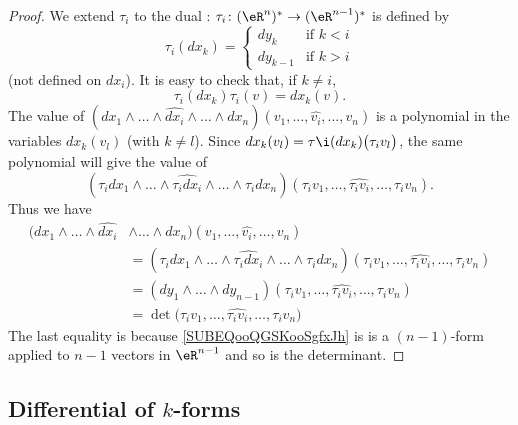 \begin{proof}
    We extend \( \tau_i\) to the dual : \( \tau_i\colon(\eR^n)^*  \to (\eR^{n-1})^*\) is defined by
    \begin{equation}
        \tau_i(dx_k)=\begin{cases}
            dy_k    &   \text{if } k<i\\
            dy_{k-1}    &    \text{if } k>i
        \end{cases}
    \end{equation}
    (not defined on \( dx_i\)). It is easy to check that, if \( k\neq i\),
    \begin{equation}
        \tau_i(dx_k)\tau_i(v)=dx_k(v).
    \end{equation}
    The value of  $(dx_1\wedge\ldots\wedge\widehat{dx_i}\wedge\ldots\wedge dx_n)(v_1,\ldots, \widehat{v_i},\ldots, v_n)$ is a polynomial in the variables \( dx_k(v_l)\) (with \( k\neq l\)). Since \( dx_k(v_l)=\tau\i(dx_k)\big( \tau_iv_l \big)\), the same polynomial will give the value of
    \begin{equation}
        (\tau_idx_1\wedge\ldots\wedge \widehat{\tau_idx_i}\wedge\ldots\wedge \tau_idx_n  )(\tau_i v_1,\ldots, \widehat{\tau_iv_i},\ldots, \tau_iv_n).
    \end{equation}
    Thus we have
    \begin{subequations}
        \begin{align}
            (dx_1\wedge\ldots\wedge\widehat{dx_i}&\wedge\ldots\wedge dx_n)(v_1,\ldots, \widehat{v_i},\ldots, v_n)\\
            &=(\tau_idx_1\wedge\ldots\wedge \widehat{\tau_idx_i}\wedge\ldots\wedge \tau_idx_n  )(\tau_i v_1,\ldots, \widehat{\tau_iv_i},\ldots, \tau_iv_n)\\
            &=(dy_1\wedge\ldots\wedge dy_{n-1})(\tau_iv_1,\ldots,\widehat{\tau_iv_i},\ldots, \tau_iv_n) \label{SUBEQooQGSKooSgfxJh}\\
            &=\det\big( \tau_iv_1,\ldots, \widehat{\tau_i v_i},\ldots, \tau_iv_n \big)
        \end{align}
    \end{subequations}
    The last equality is because \eqref{SUBEQooQGSKooSgfxJh} is is a \( (n-1)\)-form applied to \( n-1\) vectors in \( \eR^{n-1}\) and so is the determinant.
\end{proof}

\subsection{Differential of \texorpdfstring{$k$}{k}-forms}

